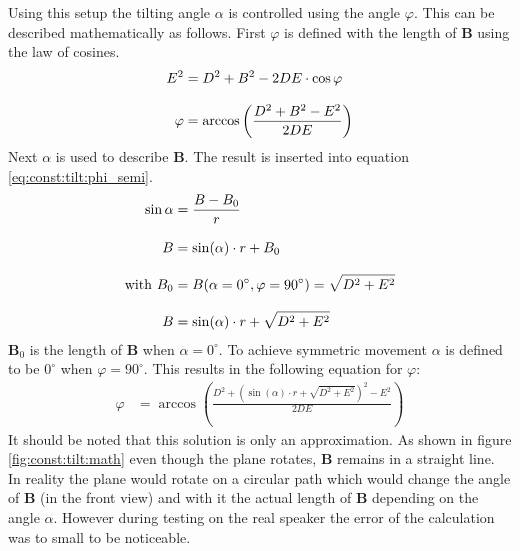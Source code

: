 \p
Using this setup the tilting angle $\alpha$ is controlled using the angle $\varphi$. This can be described mathematically as follows. First $\varphi$ is defined with the length of \textbf{B} using the law of cosines.
%
\begin{align}
  E^2     &= D^2 + B^2 - 2DE \cdot \cos \varphi \pmath
  \varphi &= \arccos \left( \frac{D^2 + B^2 - E^2}{2DE} \right) \label{eq:const:tilt:phi_semi}
\end{align}
%
Next $\alpha$ is used to describe \textbf{B}. The result is inserted into equation \ref{eq:const:tilt:phi_semi}.
%
\begin{align}
  \sin \alpha &= \frac{B - B_0}{r}\pmath
  B           &= \sin (\alpha) \cdot r + B_0\pmath
  \mathrm{with~} B_0 &= B(\alpha = 0^\circ, \varphi = 90^\circ) = \sqrt{D^2 + E^2}\pmath
  B           &= \sin (\alpha) \cdot r + \sqrt{D^2 + E^2}
\end{align}
%
\textbf{B$_0$} is the length of \textbf{B} when $\alpha = 0^\circ$. To achieve symmetric movement $\alpha$ is defined to be $0^\circ$ when $\varphi = 90^\circ$. This results in the following equation for $\varphi$:
%
\begin{align}
  \varphi &= \arccos \left( \frac{D^2 + (\sin (\alpha) \cdot r + \sqrt{D^2 + E^2})^2 - E^2}{2DE} \right)
\end{align}
%
It should be noted that this solution is only an approximation. As shown in figure \ref{fig:const:tilt:math} even though the plane rotates, \textbf{B} remains in a straight line. In reality the plane would rotate on a circular path which would change the angle of \textbf{B} (in the front view) and with it the actual length of \textbf{B} depending on the angle $\alpha$. However during testing on the real speaker the error of the calculation was to small to be noticeable.